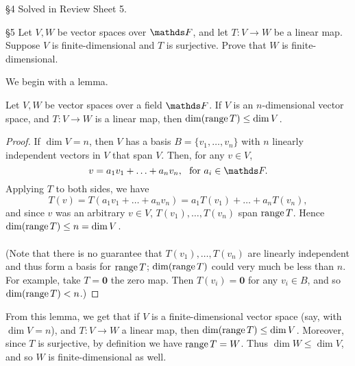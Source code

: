 \documentclass{homework}
\begin{document}
\begin{problem}{\S 4}
  Solved in Review Sheet 5.
\end{problem}

\begin{problem}{\S 5}
  Let $V,W$ be vector spaces over $\F$, and let $T:V\to W$ be a linear map. Suppose $V$ is
  finite-dimensional and $T$ is surjective. Prove that $W$ is finite-dimensional.
\end{problem}

\begin{solution}
  We begin with a lemma.
  \begin{lemma}[]{}
    Let $V,W$ be vector spaces over a field $\F$. If $V$ is an $n$-dimensional vector space, and
    $T:V\to W$ is a linear map, then $\dim(\operatorname{range} T) \le \dim V$.
  \end{lemma}
  \begin{proof}[Proof]
    If $\dim V=n$, then $V$ has a basis $B=\{ v_1,\ldots,v_n \}$ with $n$ linearly independent
    vectors in $V$ that span $V$. Then, for any $v\in V$,\[
      v=a_1v_1+\ldots+a_nv_n,\ ~\text{for}~a_i\in \F
    .\] Applying $T$ to both sides, we have \[
      T(v) = T(a_1v_1+\ldots+a_nv_n)= a_1T(v_1)+\ldots+a_nT(v_n)
    ,\] and since $v$ was an arbitrary $v\in V$, $T(v_1),\ldots,T(v_n)$ span $\operatorname{range} T$. Hence
    $\dim(\operatorname{range} T) \le n = \dim V$.\\\\
    (Note that there is no guarantee that $T(v_1),\ldots,T(v_n)$ are linearly independent and thus 
    form a basis for $\operatorname{range} T$; $\dim(\operatorname{range} T)$ could very much be less than $n$. For example,
    take $T=\textbf{0}$ the zero map. Then $T(v_i)=\textbf{0}$ for any $v_i\in B$, and so
    $\dim(\operatorname{range} T) < n$.)
  \end{proof}
  

  From this lemma, we get that if $V$ is a finite-dimensional vector space (say, with $\dim V = n$),
  and $T:V\to W$ a linear map, then $\dim(\operatorname{range} T) \le  \dim V$. Moreover, since $T$ is surjective,
  by definition we have $\operatorname{range} T = W$. Thus $\dim W \le \dim V$, and so $W$ is finite-dimensional
  as well.
\end{solution}
\end{document}
